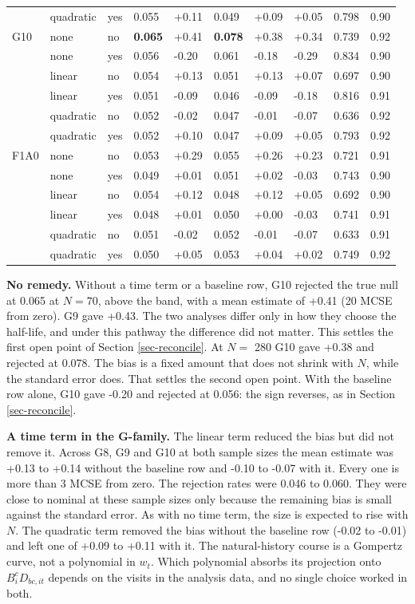 \documentclass[
  11pt,
]{article}
\newcounter{none} %
\begin{document}
\begin{table}
{\begin{tabular}[t]{llllllllll}
 & quadratic & yes & 0.055 & +0.11 & 0.049 & +0.09 & +0.05 & 0.798 & 0.90\\
G10 & none & no & \textbf{0.065} & +0.41 & \textbf{0.078} & +0.38 & +0.34 & 0.739 & 0.92\\
 & none & yes & 0.056 & -0.20 & 0.061 & -0.18 & -0.29 & 0.834 & 0.90\\
 & linear & no & 0.054 & +0.13 & 0.051 & +0.13 & +0.07 & 0.697 & 0.90\\
 & linear & yes & 0.051 & -0.09 & 0.046 & -0.09 & -0.18 & 0.816 & 0.91\\
 & quadratic & no & 0.052 & -0.02 & 0.047 & -0.01 & -0.07 & 0.636 & 0.92\\
 & quadratic & yes & 0.052 & +0.10 & 0.047 & +0.09 & +0.05 & 0.793 & 0.92\\
F1A0 & none & no & 0.053 & +0.29 & 0.055 & +0.26 & +0.23 & 0.721 & 0.91\\
 & none & yes & 0.049 & +0.01 & 0.051 & +0.02 & -0.03 & 0.743 & 0.90\\
 & linear & no & 0.054 & +0.12 & 0.048 & +0.12 & +0.05 & 0.692 & 0.90\\
 & linear & yes & 0.048 & +0.01 & 0.050 & +0.00 & -0.03 & 0.741 & 0.91\\
 & quadratic & no & 0.051 & -0.02 & 0.052 & -0.01 & -0.07 & 0.633 & 0.91\\
 & quadratic & yes & 0.050 & +0.05 & 0.053 & +0.04 & +0.02 & 0.749 & 0.92\\
\bottomrule
\end{tabular}}
\end{table}

\textbf{No remedy.} Without a time term or a baseline row, G10 rejected the
true null at 0.065 at \(N = 70\), above the band, with a mean
estimate of +0.41 (20 MCSE from zero). G9
gave +0.43. The two analyses differ only in how they choose
the half-life, and under this pathway the difference did not matter.
This settles the first open point of Section \ref{sec-reconcile}.
At \(N =\) 280 G10 gave +0.38 and rejected at
0.078. The bias is a fixed amount that does not shrink
with \(N\), while the standard error does. That settles the second open
point. With the baseline row alone, G10 gave -0.20 and
rejected at 0.056: the sign reverses, as in Section
\ref{sec-reconcile}.

\textbf{A time term in the G-family.} The linear term reduced the bias but
did not remove it. Across G8, G9 and G10 at both sample sizes the
mean estimate was +0.13 to +0.14 without the baseline row and
-0.10 to -0.07 with it. Every one is more than 3 MCSE from zero.
The rejection rates were 0.046 to 0.060. They were close to nominal
at these sample sizes only because the remaining bias is small against
the standard error. As with no time term, the size is expected to
rise with \(N\). The quadratic term removed the bias without the
baseline row (-0.02 to -0.01) and left one of +0.09 to +0.11 with
it. The natural-history course is a Gompertz curve, not a
polynomial in \(w_t\). Which polynomial absorbs its projection onto
\(B^c_i D_{bc,it}\) depends on the visits in the analysis data, and no
single choice worked in both.
\end{document}
